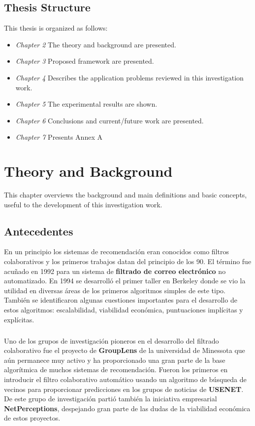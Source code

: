\documentclass[12pt,letterpaper,oneside] {memoir}
\begin{document}
\paragraph{}
\section{Thesis Structure}
This thesis is organized as follows:
\begin{itemize}
\item \textit{Chapter 2} The theory and background are presented.
\item \textit{Chapter 3} Proposed framework are presented. 
\item \textit{Chapter 4} Describes the application problems reviewed in this investigation work.
\item \textit{Chapter 5} The experimental results are shown.
\item \textit{Chapter 6} Conclusions and current/future work are presented.
\item \textit{Chapter 7} Presents Annex A
\end{itemize}
\chapter{Theory and Background}
This chapter overviews the background and main definitions and basic concepts, useful to the development of this investigation work.
\paragraph{} 
\section{Antecedentes}
En un principio los sistemas de recomendación eran conocidos como filtros colaborativos y los primeros trabajos datan del principio de los 90. El término fue acuñado en 1992  para un sistema de \textbf{filtrado de correo electrónico} no automatizado. En 1994 se desarrolló  el primer taller en Berkeley donde se vio la utilidad en diversas áreas de los primeros algoritmos simples de este tipo. También se identificaron algunas cuestiones importantes para el desarrollo de estos algoritmos: escalabilidad, viabilidad económica, puntuaciones implícitas y explícitas. 
\paragraph{}
Uno de los grupos de investigación pioneros en el desarrollo del filtrado colaborativo fue el proyecto de \textbf{GroupLens} de la universidad de Minessota que aún permanece muy activo y ha proporcionado una gran parte de la base algorítmica de muchos sistemas de recomendación. Fueron los primeros en introducir  el filtro colaborativo automático usando un algoritmo de búsqueda de vecinos para proporcionar predicciones en los grupos de noticias de \textbf{USENET}. De este grupo de investigación partió también la iniciativa empresarial \textbf{NetPerceptions}, despejando gran parte de las dudas de la viabilidad económica de estos proyectos.
\end{document}
